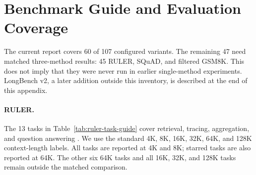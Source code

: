 \section{Benchmark Guide and Evaluation Coverage}
\label{app:benchmarks}

The current report covers 60 of 107 configured variants. The remaining
47 need matched three-method results: 45 RULER, SQuAD, and
filtered GSM8K. This does not imply that they were never run in earlier
single-method experiments. LongBench v2, a later addition outside this
inventory, is described at the end of this appendix.

\paragraph{RULER.}
The 13 tasks in Table~\ref{tab:ruler-task-guide} cover retrieval, tracing,
aggregation, and question answering \citep{hsieh2024ruler}. We use the
standard 4K, 8K, 16K, 32K, 64K, and 128K context-length labels.
All tasks are reported at 4K and 8K; starred tasks are also reported at
64K. The other six 64K tasks and all 16K, 32K, and 128K tasks remain
outside the matched comparison.

